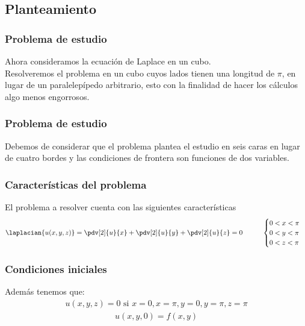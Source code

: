 \subsection{Planteamiento}
\begin{frame}
\frametitle{Problema de estudio}
Ahora consideramos la ecuación de Laplace en un cubo.
\\
\bigskip
Resolveremos el problema en un cubo cuyos lados tienen una longitud de $\pi$, en lugar de un paralelepípedo arbitrario, esto con la finalidad de hacer los cálculos algo menos engorrosos.
\end{frame}
\begin{frame}
\frametitle{Problema de estudio}
Debemos de considerar que el problema plantea el estudio en seis caras en lugar de cuatro bordes y las condiciones de frontera son funciones de dos variables.
\end{frame}
\begin{frame}
\frametitle{Características del problema}
El problema a resolver cuenta con las siguientes características
\fontsize{12}{12}\selectfont
\begin{align*}
\laplacian{u(x, y, z)} = \pdv[2]{u}{x} + \pdv[2]{u}{y} + \pdv[2]{u}{z} = 0 \hspace{1cm} \begin{cases}
0 < x < \pi \\
0 < y < \pi \\
0 < z < \pi 
\end{cases}
\end{align*}
\end{frame}
\begin{frame}
\frametitle{Condiciones iniciales}
Además tenemos que:
\begin{align*}
u(x, y , z) = 0 \mbox{  si  } x = 0, x = \pi, y = 0, y = \pi , z = \pi 
\end{align*}
\pause
\begin{align*}
u(x, y , 0) = f (x, y)
\end{align*}
\end{frame}
